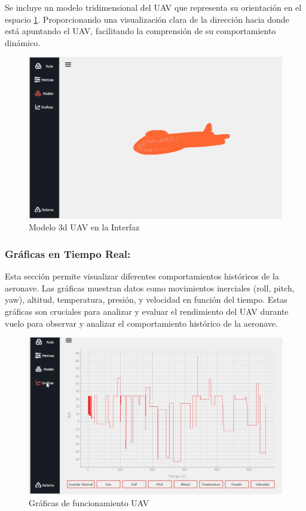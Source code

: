 Se incluye un modelo tridimensional del UAV que representa su orientación en el espacio \ref{fig:modelo 3d inerfaz }.  Proporcionando una visualización clara de la dirección hacia donde está apuntando el UAV, facilitando la comprensión de su comportamiento dinámico.
\begin{figure}[H]
    \centering
    \includegraphics[width=5 in]{Imagenes/Interfaz/modelo3d.png}
    \caption{Modelo 3d UAV en la Interfaz}
    \label{fig:modelo 3d inerfaz }
\end{figure}

\subsubsection{Gráficas en Tiempo Real:}

Esta sección permite visualizar diferentes comportamientos históricos de la aeronave. Las gráficas muestran datos como movimientos inerciales (roll, pitch, yaw), altitud, temperatura, presión, y velocidad en función del tiempo. Estas gráficas son cruciales para analizar y evaluar el rendimiento del UAV durante vuelo para observar y analizar el comportamiento histórico de la aeronave.

\begin{figure}[H]
    \centering
    \includegraphics[width=6  in]{Imagenes/Interfaz/graficas.png}
    \caption{Gráficas de funcionamiento UAV }
    \label{fig:graficas }
\end{figure}
